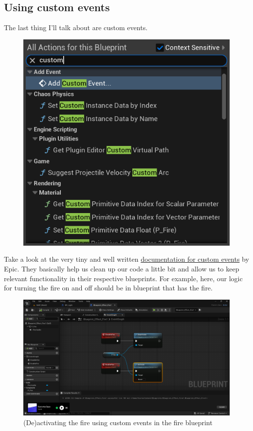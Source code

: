 \documentclass[]{article}
\begin{document}
	\subsection{Using custom events}
	The last thing I'll talk about are custom events.
	
	\begin{figure}[hb!]
		\centering
		\includegraphics[width=0.55\linewidth]{week2part2/screenshot019}
	\end{figure}
	
	Take a look at the very tiny and well written \href{https://dev.epicgames.com/documentation/en-us/unreal-engine/custom-events-in-unreal-engine}{documentation for custom events} by Epic. They basically help us clean up our code a little bit and allow us to keep relevant functionality in their respective blueprints. For example, here, our logic for turning the fire on and off should be in blueprint that has the fire.
	
	\begin{figure}[h]
		\centering
		\includegraphics[width=0.8\linewidth]{week2part2/screenshot020}
		\caption{(De)activating the fire using custom events in the fire blueprint}
		\label{fig:screenshot020}
	\end{figure}
	
\end{document}
